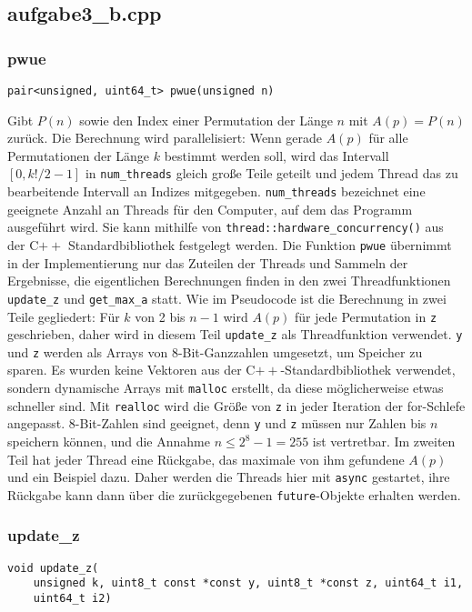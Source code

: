 \documentclass[a4paper, 10pt, ngerman]{article}
\begin{document}
\subsection{aufgabe3\_b.cpp}

\subsubsection{pwue}
\verb|pair<unsigned, uint64_t> pwue(unsigned n)|
\medskip

\noindent Gibt $P(n)$ sowie den Index einer Permutation der Länge $n$ mit $A(p) = P(n)$ zurück. Die Berechnung wird parallelisiert: Wenn gerade $A(p)$ für alle Permutationen der Länge $k$ bestimmt werden soll, wird das Intervall $[0, k!/2 - 1]$ in \verb|num_threads| gleich große Teile geteilt und jedem Thread das zu bearbeitende Intervall an Indizes mitgegeben. \verb|num_threads| bezeichnet eine geeignete Anzahl an Threads für den Computer, auf dem das Programm ausgeführt wird. Sie kann mithilfe von \verb|thread::hardware_concurrency()| aus der C$++$ Standardbibliothek festgelegt werden. Die Funktion \verb|pwue| übernimmt in der Implementierung nur das Zuteilen der Threads und Sammeln der Ergebnisse, die eigentlichen Berechnungen finden in den zwei Threadfunktionen \verb|update_z| und \verb|get_max_a| statt. Wie im Pseudocode ist die Berechnung in zwei Teile gegliedert: Für $k$ von 2 bis $n - 1$ wird $A(p)$ für jede Permutation in \verb|z| geschrieben, daher wird in diesem Teil \verb|update_z| als Threadfunktion verwendet. \verb|y| und \verb|z| werden als Arrays von 8-Bit-Ganzzahlen umgesetzt, um Speicher zu sparen. Es wurden keine Vektoren aus der C$++$-Standardbibliothek verwendet, sondern dynamische Arrays mit \verb|malloc| erstellt, da diese möglicherweise etwas schneller sind. Mit \verb|realloc| wird die Größe von \verb|z| in jeder Iteration der for-Schlefe angepasst. 8-Bit-Zahlen sind geeignet, denn \verb|y| und \verb|z| müssen nur Zahlen bis $n$ speichern können, und die Annahme $n \le 2^8 - 1 = 255$ ist vertretbar. Im zweiten Teil hat jeder Thread eine Rückgabe, das maximale von ihm gefundene $A(p)$ und ein Beispiel dazu. Daher werden die Threads hier mit \verb|async| gestartet, ihre Rückgabe kann dann über die zurückgegebenen \verb|future|-Objekte erhalten werden.

\subsubsection{update\_z}
\verb|void update_z(| \\
\verb|    unsigned k, uint8_t const *const y, uint8_t *const z, uint64_t i1,| \\
\verb|    uint64_t i2)|
\medskip
\end{document}
